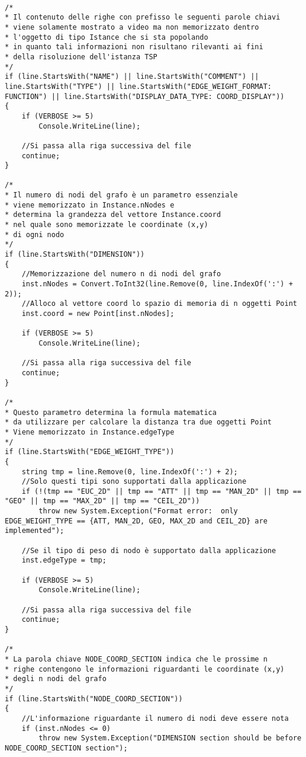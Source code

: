 \documentclass[11pt]{article}
\begin{document}
\begin{lstlisting}

/*
* Il contenuto delle righe con prefisso le seguenti parole chiavi
* viene solamente mostrato a video ma non memorizzato dentro
* l'oggetto di tipo Istance che si sta popolando
* in quanto tali informazioni non risultano rilevanti ai fini
* della risoluzione dell'istanza TSP
*/
if (line.StartsWith("NAME") || line.StartsWith("COMMENT") || line.StartsWith("TYPE") || line.StartsWith("EDGE_WEIGHT_FORMAT: FUNCTION") || line.StartsWith("DISPLAY_DATA_TYPE: COORD_DISPLAY")) 
{
    if (VERBOSE >= 5)
        Console.WriteLine(line);
    
    //Si passa alla riga successiva del file
    continue;
}

/*
* Il numero di nodi del grafo è un parametro essenziale
* viene memorizzato in Instance.nNodes e
* determina la grandezza del vettore Instance.coord
* nel quale sono memorizzate le coordinate (x,y)
* di ogni nodo
*/
if (line.StartsWith("DIMENSION"))
{
    //Memorizzazione del numero n di nodi del grafo
    inst.nNodes = Convert.ToInt32(line.Remove(0, line.IndexOf(':') + 2));
    //Alloco al vettore coord lo spazio di memoria di n oggetti Point
    inst.coord = new Point[inst.nNodes];
    
    if (VERBOSE >= 5)
        Console.WriteLine(line);
    
    //Si passa alla riga successiva del file
    continue;
}

/*
* Questo parametro determina la formula matematica
* da utilizzare per calcolare la distanza tra due oggetti Point
* Viene memorizzato in Instance.edgeType
*/
if (line.StartsWith("EDGE_WEIGHT_TYPE"))
{
    string tmp = line.Remove(0, line.IndexOf(':') + 2);
    //Solo questi tipi sono supportati dalla applicazione
    if (!(tmp == "EUC_2D" || tmp == "ATT" || tmp == "MAN_2D" || tmp == "GEO" || tmp == "MAX_2D" || tmp == "CEIL_2D"))
        throw new System.Exception("Format error:  only EDGE_WEIGHT_TYPE == {ATT, MAN_2D, GEO, MAX_2D and CEIL_2D} are implemented");
    
    //Se il tipo di peso di nodo è supportato dalla applicazione
    inst.edgeType = tmp;

    if (VERBOSE >= 5)
        Console.WriteLine(line);
    
    //Si passa alla riga successiva del file
    continue;
}

/*
* La parola chiave NODE_COORD_SECTION indica che le prossime n
* righe contengono le informazioni riguardanti le coordinate (x,y)
* degli n nodi del grafo
*/
if (line.StartsWith("NODE_COORD_SECTION"))
{
    //L'informazione riguardante il numero di nodi deve essere nota
    if (inst.nNodes <= 0)
        throw new System.Exception("DIMENSION section should be before NODE_COORD_SECTION section");
        

\end{lstlisting}
\end{document}
